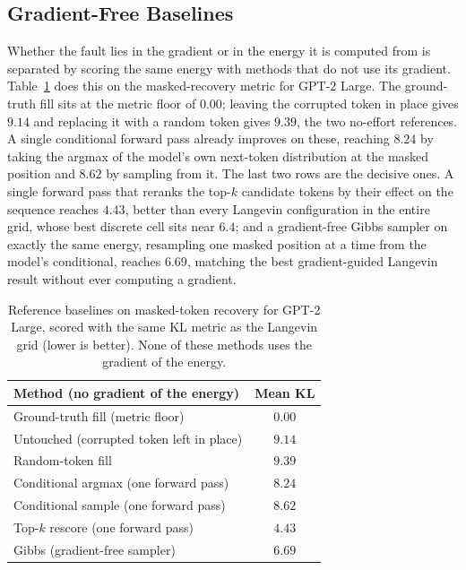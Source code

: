 \subsection{Gradient-Free Baselines}
\label{sec:results-baselines}

Whether the fault lies in the gradient or in the energy it is computed from is separated by scoring the same energy with methods that do not use its gradient. Table~\ref{tab:baselines} does this on the masked-recovery metric for GPT-2 Large. The ground-truth fill sits at the metric floor of $0.00$; leaving the corrupted token in place gives $9.14$ and replacing it with a random token gives $9.39$, the two no-effort references. A single conditional forward pass already improves on these, reaching $8.24$ by taking the argmax of the model's own next-token distribution at the masked position and $8.62$ by sampling from it. The last two rows are the decisive ones. A single forward pass that reranks the top-$k$ candidate tokens by their effect on the sequence reaches $4.43$, better than every Langevin configuration in the entire grid, whose best discrete cell sits near $6.4$; and a gradient-free Gibbs sampler on exactly the same energy, resampling one masked position at a time from the model's conditional, reaches $6.69$, matching the best gradient-guided Langevin result without ever computing a gradient.

\begin{table}[t]
    \centering
    \small
    \begin{tabular}{lc}
        \toprule
        Method (no gradient of the energy) & Mean KL \\
        \midrule
        Ground-truth fill (metric floor)        & $0.00$ \\
        Untouched (corrupted token left in place) & $9.14$ \\
        Random-token fill                        & $9.39$ \\
        Conditional argmax (one forward pass)    & $8.24$ \\
        Conditional sample (one forward pass)    & $8.62$ \\
        Top-$k$ rescore (one forward pass)       & $4.43$ \\
        Gibbs (gradient-free sampler)            & $6.69$ \\
        \bottomrule
    \end{tabular}
    \caption[Gradient-free reference baselines on masked-token recovery.]{Reference baselines on masked-token recovery for GPT-2 Large, scored with the same KL metric as the Langevin grid (lower is better). None of these methods uses the gradient of the energy.}
    \label{tab:baselines}
\end{table}

